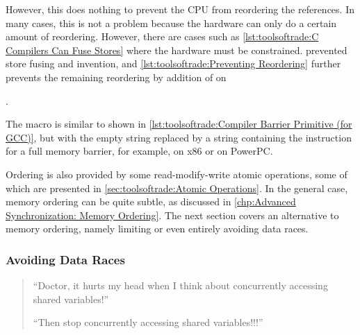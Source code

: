 However, this does nothing to prevent the CPU from reordering the
references.
In many cases, this is not a problem because the hardware can only do
a certain amount of reordering.
However, there are cases such as
\cref{lst:toolsoftrade:C Compilers Can Fuse Stores} where the
hardware must be constrained.
prevented store fusing and invention, and
\cref{lst:toolsoftrade:Preventing Reordering}
further prevents the remaining reordering by addition of
 on
\begin{fcvref}
.
\end{fcvref}
The  macro is similar to  shown in
\cref{lst:toolsoftrade:Compiler Barrier Primitive (for GCC)},
but with the empty string replaced by a string containing the
instruction for a full memory barrier, for example, 
on x86 or  on PowerPC.

\QuickQuizEnd

Ordering is also provided by some read-modify-write atomic
operations, some of which are presented in
\cref{sec:toolsoftrade:Atomic Operations}.
In the general case, memory ordering can be quite subtle, as
discussed in
\cref{chp:Advanced Synchronization: Memory Ordering}.
The next section covers an alternative to memory ordering, namely
limiting or even entirely avoiding data races.

\subsubsection{Avoiding Data Races}
\label{sec:toolsoftrade:Avoiding Data Races}

\begin{quote}
``Doctor, it hurts my head when I think about concurrently accessing
shared variables!''

``Then stop concurrently accessing shared variables!!!''
\end{quote}

